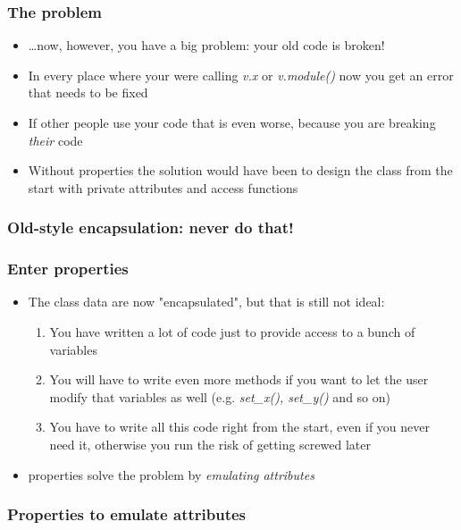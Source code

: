 \documentclass[9pt]{beamer}
\begin{document}
\begin{frame}
  \frametitle{The problem}
  \begin{itemize}
    \item \dots now, however, you have a big problem: your old code is broken!
    \medskip
    \item In every place where your were calling \emph{v.x} or \emph{v.module()}
          now you get an error that needs to be fixed
    \medskip
    \item If other people use your code that is even worse, because you are breaking \emph{their} code
    \medskip
    \item Without properties the solution would have been to design the class from
          the start with private attributes and access functions
  \end{itemize}
\end{frame}


\begin{frame}
  \frametitle{Old-style encapsulation: never do that!}
  
\end{frame}

\begin{frame}
\frametitle{Enter properties}
  \begin{itemize}
    \item The class data are now "encapsulated", but that is still not ideal:
    \medskip
    \begin{enumerate}
    \item You have written a lot of code just to provide access to a bunch of
          variables
    \medskip
    \item You will have to write even more methods if you want to let the user
          modify that variables as well (e.g. \emph{set\_x(), set\_y()} and so on)
    \medskip
    \item You have to write all this code right from the start, even if you 
          never need it, otherwise you run the risk of getting screwed later
    \end{enumerate}
    \medskip
    \item \alert{properties} solve the problem by \emph{emulating attributes}
  \end{itemize}
\end{frame}


\begin{frame}
  \frametitle{Properties to emulate attributes}
  
\end{frame}
\end{document}
